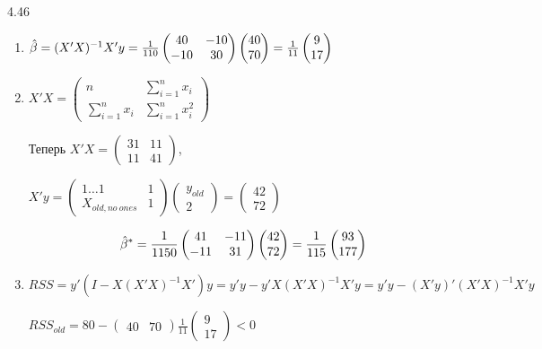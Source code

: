 \begin{solution}{{4.46}}

\begin{enumerate}
\item
$\hat{\beta}=(X'X)^{-1}X'y=
\frac{1}{110}\begin{pmatrix}
40&-10\\
-10&30
\end{pmatrix}
\begin{pmatrix}
40\\
70
\end{pmatrix}=
\frac{1}{11}
\begin{pmatrix}
9\\
17
\end{pmatrix}
$

\item
$X'X=
\begin{pmatrix}
n&\sum^n_{i=1}x_i\\
\sum^n_{i=1}x_i&\sum^n_{i=1}x_i^2
\end{pmatrix} $

Теперь
$X'X=\begin{pmatrix}
31&11\\
11&41
\end{pmatrix}
$,

$X'y=\begin{pmatrix}
1\ldots 1    &1\\
X_{old, no\>ones}&1
\end{pmatrix}
\begin{pmatrix}
y_{old}\\
2
\end{pmatrix}=
\begin{pmatrix}
42\\
72
\end{pmatrix}
$

\[
\hat{\beta}^*=\frac{1}{1150}\begin{pmatrix}
41&-11\\
-11&31
\end{pmatrix}
\begin{pmatrix}
42\\
72
\end{pmatrix}=
\frac{1}{115}
\begin{pmatrix}
93\\
177
\end{pmatrix}
\]

\item
$RSS=y'(I-X(X'X)^{-1}X')y=y'y-y'X(X'X)^{-1}X'y=y'y-(X'y)'(X'X)^{-1}X'y$

$RSS_{old}=80-\begin{pmatrix}
40&70
\end{pmatrix}\frac{1}{11}
\begin{pmatrix}
9\\
17
\end{pmatrix}<0
$


\end{enumerate}
\end{solution}
